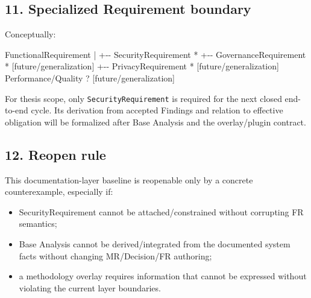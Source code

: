 \documentclass[
  10pt,
]{article}
\newenvironment{Shaded}{}{}
\newcommand{\NormalTok}[1]{#1}
\providecommand{\tightlist}{%
  \setlength{\itemsep}{0pt}\setlength{\parskip}{0pt}}
\begin{document}
\subsection{11. Specialized Requirement
boundary}\label{11-specialized-requirement-boundary}

Conceptually:

\begin{Shaded}
\begin{Highlighting}[]
\NormalTok{FunctionalRequirement}
\NormalTok{      |}
\NormalTok{      +{-}{-} SecurityRequirement *}
\NormalTok{      +{-}{-} GovernanceRequirement *   [future/generalization]}
\NormalTok{      +{-}{-} PrivacyRequirement *      [future/generalization]}
\NormalTok{      \textasciigrave{}{-}{-} Performance/Quality ?     [future/generalization]}
\end{Highlighting}
\end{Shaded}

For thesis scope, only \texttt{SecurityRequirement} is required for the
next closed end-to-end cycle. Its derivation from accepted Findings and
relation to effective obligation will be formalized after Base Analysis
and the overlay/plugin contract.

\subsection{12. Reopen rule}\label{12-reopen-rule}

This documentation-layer baseline is reopenable only by a concrete
counterexample, especially if:

\begin{itemize}
\tightlist
\item
  SecurityRequirement cannot be attached/constrained without corrupting
  FR semantics;
\item
  Base Analysis cannot be derived/integrated from the documented system
  facts without changing MR/Decision/FR authoring;
\item
  a methodology overlay requires information that cannot be expressed
  without violating the current layer boundaries.
\end{itemize}
\end{document}
